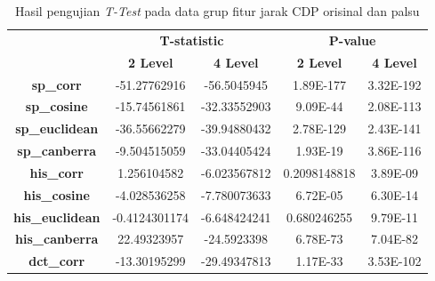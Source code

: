 \begin{table}[!ht]
	\centering
	\caption{Hasil pengujian \emph{T-Test} pada data grup fitur jarak CDP orisinal dan palsu}
	\vspace{0.5em}
	\begin{tabular}{|c|cc|cc|}
		\hline
		\multirow{2}{*}{}       & \multicolumn{2}{c|}{\textbf{T-statistic}} & \multicolumn{2}{c|}{\textbf{P-value}}                                                            \\ \cline{2-5}
		                        & \multicolumn{1}{c|}{\textbf{2 Level}}     & \textbf{4 Level}                      & \multicolumn{1}{c|}{\textbf{2 Level}} & \textbf{4 Level} \\ \hline
		\textbf{sp\_corr}       & \multicolumn{1}{c|}{-51.27762916}         & -56.5045945                           & \multicolumn{1}{c|}{1.89E-177}        & 3.32E-192        \\ \hline
		\textbf{sp\_cosine}     & \multicolumn{1}{c|}{-15.74561861}         & -32.33552903                          & \multicolumn{1}{c|}{9.09E-44}         & 2.08E-113        \\ \hline
		\textbf{sp\_euclidean}  & \multicolumn{1}{c|}{-36.55662279}         & -39.94880432                          & \multicolumn{1}{c|}{2.78E-129}        & 2.43E-141        \\ \hline
		\textbf{sp\_canberra}   & \multicolumn{1}{c|}{-9.504515059}         & -33.04405424                          & \multicolumn{1}{c|}{1.93E-19}         & 3.86E-116        \\ \hline
		\textbf{his\_corr}      & \multicolumn{1}{c|}{1.256104582}          & -6.023567812                          & \multicolumn{1}{c|}{0.2098148818}     & 3.89E-09         \\ \hline
		\textbf{his\_cosine}    & \multicolumn{1}{c|}{-4.028536258}         & -7.780073633                          & \multicolumn{1}{c|}{6.72E-05}         & 6.30E-14         \\ \hline
		\textbf{his\_euclidean} & \multicolumn{1}{c|}{-0.4124301174}        & -6.648424241                          & \multicolumn{1}{c|}{0.680246255}      & 9.79E-11         \\ \hline
		\textbf{his\_canberra}  & \multicolumn{1}{c|}{22.49323957}          & -24.5923398                           & \multicolumn{1}{c|}{6.78E-73}         & 7.04E-82         \\ \hline
		\textbf{dct\_corr}      & \multicolumn{1}{c|}{-13.30195299}         & -29.49347813                          & \multicolumn{1}{c|}{1.17E-33}         & 3.53E-102        \\ \hline

\end{tabular}
\end{table}
